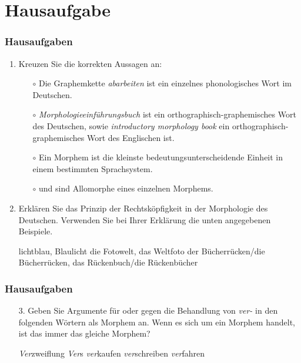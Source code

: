 \section{Hausaufgabe}

\begin{frame}
\frametitle{Hausaufgaben}


\begin{enumerate}
	\item Kreuzen Sie die korrekten Aussagen an: %
	
	\begin{itemize}
		\item[$\circ$] Die Graphemkette \emph{abarbeiten} ist ein einzelnes phonologisches Wort im Deutschen.
		\item[$\circ$] \emph{Morphologieeinführungsbuch} ist ein orthographisch-graphemisches Wort des Deutschen, sowie \emph{introductory morphology book} ein orthographisch-graphemisches Wort des Englischen ist.
		\item[$\circ$] Ein Morphem ist die kleinste bedeutungsunterscheidende Einheit in einem bestimmten Sprachsystem.
		\item[$\circ$]  und  sind Allomorphe eines einzelnen Morphems.
	\end{itemize}
	
	\item Erklären Sie das Prinzip der Rechtsköpfigkeit in der Morphologie des Deutschen. Verwenden Sie bei Ihrer Erklärung die unten angegebenen Beispiele.%
	
	\eal
	\ex lichtblau, Blaulicht
	\ex die Fotowelt, das Weltfoto
	\ex der Bücherrücken/die Bücherrücken, das Rückenbuch/die Rückenbücher
	\zl
\end{enumerate}

\end{frame}


\begin{frame}
\frametitle{Hausaufgaben}

\begin{itemize}
\item[3.] Geben Sie Argumente für oder gegen die Behandlung von \emph{ver-} in den folgenden Wörtern als Morphem an. Wenn es sich um ein Morphem handelt, ist das immer das gleiche Morphem? %

\eal
\ex \emph{Ver}zweiflung
\ex \emph{Ver}s
\ex \emph{ver}kaufen
\ex \emph{ver}schreiben
\ex \emph{ver}fahren
\zl

\end{itemize}
\end{frame}


